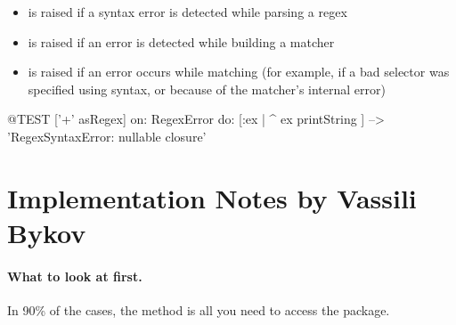 \documentclass[a4paper,10pt,twoside]{book}
\begin{document}
{\begin{itemize}

\item {} is raised if a syntax error is detected while parsing a regex

\item {} is raised if an error is detected while building a matcher

\item {} is raised if an error occurs while matching (for example, if a bad selector was specified using  syntax, or because of the matcher's internal error)



\end{itemize}


\begin{code}{@TEST}
['+' asRegex] on: RegexError do: [:ex | ^ ex printString ]                                        --> 'RegexSyntaxError:  nullable closure'
\end{code}
\section{Implementation Notes by Vassili Bykov}

\paragraph{What to look at first.}
In 90\% of the cases, the method   is all you need to access the package.

}
\end{document}
